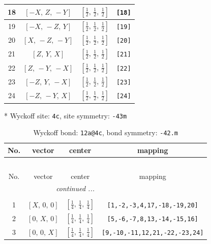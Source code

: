 \documentclass[fleqn,8pt]{jsarticle}
\begin{document}
\begin{longtable}{cccc}
18 & $\left[ - X,\, Z,\, - Y \right]$ & $\left[ \frac{1}{2},\, \frac{1}{2},\, \frac{1}{2} \right]$ & {\tt [18]} \\ \hline
19 & $\left[ - X,\, - Z,\, Y \right]$ & $\left[ \frac{1}{2},\, \frac{1}{2},\, \frac{1}{2} \right]$ & {\tt [19]} \\ \hline
20 & $\left[ X,\, - Z,\, - Y \right]$ & $\left[ \frac{1}{2},\, \frac{1}{2},\, \frac{1}{2} \right]$ & {\tt [20]} \\ \hline
21 & $\left[ Z,\, Y,\, X \right]$ & $\left[ \frac{1}{2},\, \frac{1}{2},\, \frac{1}{2} \right]$ & {\tt [21]} \\ \hline
22 & $\left[ Z,\, - Y,\, - X \right]$ & $\left[ \frac{1}{2},\, \frac{1}{2},\, \frac{1}{2} \right]$ & {\tt [22]} \\ \hline
23 & $\left[ - Z,\, Y,\, - X \right]$ & $\left[ \frac{1}{2},\, \frac{1}{2},\, \frac{1}{2} \right]$ & {\tt [23]} \\ \hline
24 & $\left[ - Z,\, - Y,\, X \right]$ & $\left[ \frac{1}{2},\, \frac{1}{2},\, \frac{1}{2} \right]$ & {\tt [24]} \\
\end{longtable}
* Wyckoff site: {\tt 4c}, site symmetry: {\tt -43m}
\renewcommand{\arraystretch}{1.2}
\begin{longtable}{cccc}
\caption{Wyckoff bond: {\tt 12a@4c}, bond symmetry: {\tt -42.m}}
 \\
 \hline \hline
No. & vector & center & mapping \\ \hline \endfirsthead

\multicolumn{3}{l}{\tablename\ \thetable{}} \\
 \hline \hline
No. & vector & center & mapping \\ \hline \endhead

 \hline \hline
\multicolumn{3}{r}{\footnotesize\it continued ...} \\ \endfoot

 \hline \hline
\multicolumn{3}{r}{} \\ \endlastfoot

1 & $\left[ X,\, 0,\, 0 \right]$ & $\left[ \frac{1}{4},\, \frac{1}{4},\, \frac{1}{4} \right]$ & {\tt [1,-2,-3,4,17,-18,-19,20]} \\ \hline
2 & $\left[ 0,\, X,\, 0 \right]$ & $\left[ \frac{1}{4},\, \frac{1}{4},\, \frac{1}{4} \right]$ & {\tt [5,-6,-7,8,13,-14,-15,16]} \\ \hline
3 & $\left[ 0,\, 0,\, X \right]$ & $\left[ \frac{1}{4},\, \frac{1}{4},\, \frac{1}{4} \right]$ & {\tt [9,-10,-11,12,21,-22,-23,24]} \\
\end{longtable}
\end{document}
